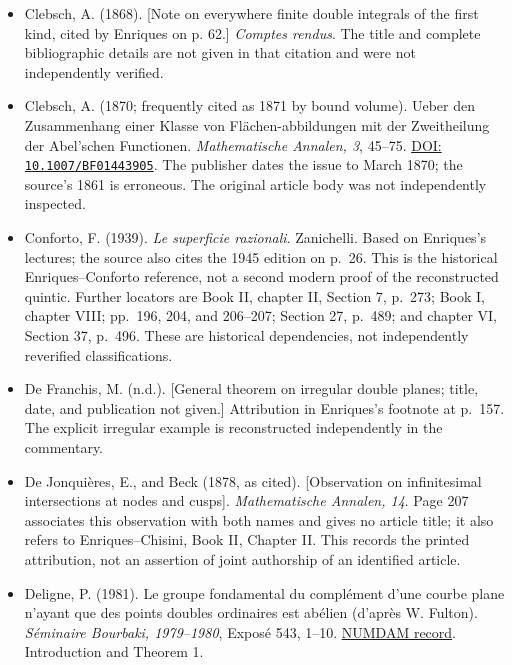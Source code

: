 \begin{sloppypar}
\begin{itemize}
\item Clebsch, A. (1868). [Note on everywhere finite double integrals of the first kind, cited by Enriques on p. 62.] \emph{Comptes rendus}. The title and complete bibliographic details are not given in that citation and were not independently verified.

\item Clebsch, A. (1870; frequently cited as 1871 by bound volume). Ueber den Zusammenhang einer Klasse von Fl\"achen-abbildungen mit der Zweitheilung der Abel'schen Functionen. \emph{Mathematische Annalen, 3}, 45--75. \href{https://doi.org/10.1007/BF01443905}{DOI: \nolinkurl{10.1007/BF01443905}}. The publisher dates the issue to March 1870; the source's 1861 is erroneous. The original article body was not independently inspected.

\item Conforto, F. (1939). \emph{Le superficie razionali}. Zanichelli. Based on Enriques's lectures; the source also cites the 1945 edition on p.~26. This is the historical Enriques--Conforto reference, not a second modern proof of the reconstructed quintic. Further locators are Book II, chapter II, Section 7, p.~273; Book I, chapter VIII; pp.~196, 204, and 206--207; Section 27, p.~489; and chapter VI, Section 37, p.~496. These are historical dependencies, not independently reverified classifications.

\item De Franchis, M. (n.d.). {[}General theorem on irregular double planes; title, date, and publication not given.{]} Attribution in Enriques's footnote at p.~157. The explicit irregular example is reconstructed independently in the commentary.

\item De Jonqui\`eres, E., and Beck (1878, as cited). [Observation on infinitesimal intersections at nodes and cusps]. \emph{Mathematische Annalen, 14}. Page 207 associates this observation with both names and gives no article title; it also refers to Enriques--Chisini, Book II, Chapter II. This records the printed attribution, not an assertion of joint authorship of an identified article.

\item Deligne, P. (1981). Le groupe fondamental du compl\'ement d'une courbe plane n'ayant que des points doubles ordinaires est ab\'elien (d'apr\`es W. Fulton). \emph{S\'eminaire Bourbaki, 1979--1980}, Expos\'e 543, 1--10. \href{https://www.numdam.org/item/SB_1979-1980__22__1_0/}{NUMDAM record}. Introduction and Theorem 1.


\end{itemize}
\end{sloppypar}
